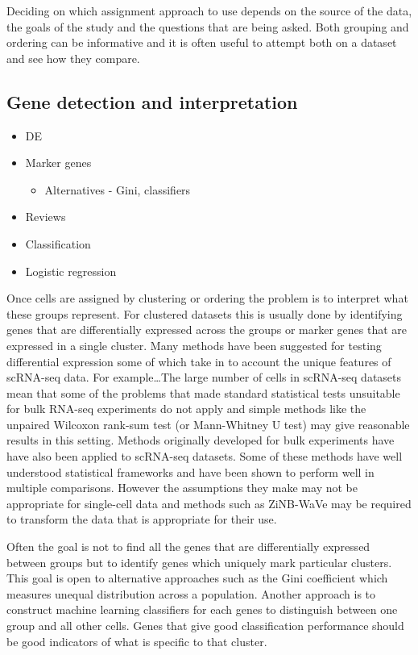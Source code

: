 \documentclass[11pt,a4paper,titlepage,twoside,openright]{style/unimelbthesis}
\theoremstyle{definition}
\theoremstyle{definition}
\theoremstyle{definition}
\theoremstyle{remark}
\begin{document}
\begin{mainmatter}
Deciding on which assignment approach to use depends on the source of the data, the goals of the study and the questions that are being asked. Both grouping and ordering can be informative and it is often useful to attempt both on a dataset and see how they compare.

\hypertarget{gene-detection-and-interpretation}{%
\subsection{Gene detection and interpretation}\label{gene-detection-and-interpretation}}

\begin{itemize}
\tightlist
\item
  DE
\item
  Marker genes

  \begin{itemize}
  \tightlist
  \item
    Alternatives - Gini, classifiers
  \end{itemize}
\item
  Reviews
\item
  Classification
\item
  Logistic regression
\end{itemize}

Once cells are assigned by clustering or ordering the problem is to interpret what these groups represent. For clustered datasets this is usually done by identifying genes that are differentially expressed across the groups or marker genes that are expressed in a single cluster. Many methods have been suggested for testing differential expression some of which take in to account the unique features of scRNA-seq data. For example\ldots{}The large number of cells in scRNA-seq datasets mean that some of the problems that made standard statistical tests unsuitable for bulk RNA-seq experiments do not apply and simple methods like the unpaired Wilcoxon rank-sum test (or Mann-Whitney U test) may give reasonable results in this setting. Methods originally developed for bulk experiments have have also been applied to scRNA-seq datasets. Some of these methods have well understood statistical frameworks and have been shown to perform well in multiple comparisons. However the assumptions they make may not be appropriate for single-cell data and methods such as ZiNB-WaVe may be required to transform the data that is appropriate for their use.

Often the goal is not to find all the genes that are differentially expressed between groups but to identify genes which uniquely mark particular clusters. This goal is open to alternative approaches such as the Gini coefficient which measures unequal distribution across a population. Another approach is to construct machine learning classifiers for each genes to distinguish between one group and all other cells. Genes that give good classification performance should be good indicators of what is specific to that cluster.


\end{mainmatter}
\end{document}
